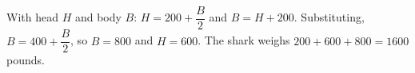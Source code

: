 With head $H$ and body $B$: $H=200+\dfrac B2$ and $B=H+200$. Substituting, $B=400+\dfrac B2$, so $B=800$ and $H=600$. The shark weighs $200+600+800=\boxed{1600}$ pounds.
